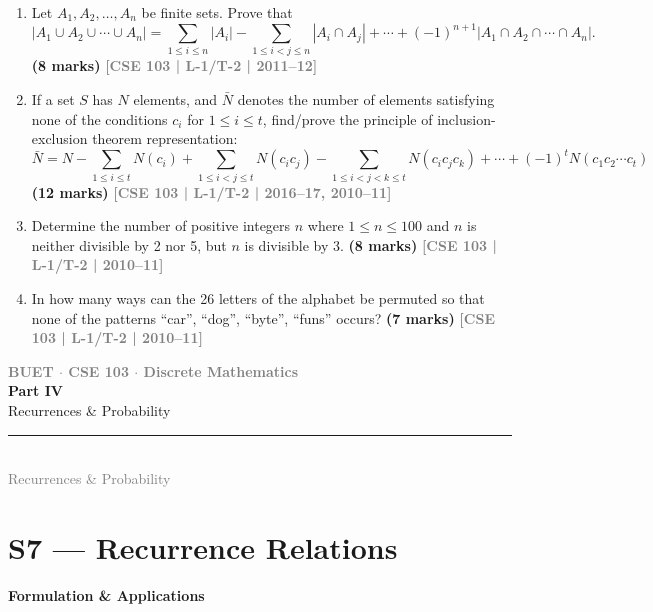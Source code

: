\documentclass[12pt,a3paper]{article}
\newcommand{\yr}[1]{\hfill\textcolor{gray}{\small\textbf{[#1]}}}
\newcommand{\mk}[1]{\textcolor{orange!70!black}{\small\textbf{(#1 marks)}}}
\newcommand{\subtopic}[2]{%
  \vspace{10pt}
  \noindent\begin{tcolorbox}[colback=#1!8,colframe=#1,boxrule=0.6pt,arc=4pt,
    left=6pt,right=6pt,top=4pt,bottom=4pt]
    \small\bfseries\textcolor{#1}{#2}
  \end{tcolorbox}
  \vspace{2pt}
}
\newcommand{\secdivider}[4]{%
  \newpage\thispagestyle{empty}%
  \vspace*{\fill}%
  \begin{tcolorbox}[enhanced,colback=#4!7,colframe=#3,boxrule=1.5pt,arc=8pt,
    left=20pt,right=20pt,top=22pt,bottom=22pt,
    shadow={3pt}{-3pt}{0pt}{black!15}]
    \centering
    {\large\textcolor{gray}{\textbf{BUET $\cdot$ CSE 103 $\cdot$ Discrete Mathematics}}}\\[8pt]
    {\fontsize{26}{32}\selectfont\bfseries\textcolor{#3}{#1}}\\[6pt]
    {\fontsize{15}{19}\selectfont\textcolor{dgray}{#2}}\\[12pt]
    \textcolor{#3!60}{\rule{0.5\textwidth}{0.5pt}}\\[6pt]
    {\small\textcolor{gray}{#2}}
  \end{tcolorbox}%
  \vspace*{\fill}\newpage%
}
\begin{document}
\begin{enumerate}
\item Let $A_1, A_2, \ldots, A_n$ be finite sets. Prove that
\[
  |A_1 \cup A_2 \cup \cdots \cup A_n| = \sum_{1 \leq i \leq n}|A_i| - \sum_{1 \leq i < j \leq n}|A_i \cap A_j| + \cdots + (-1)^{n+1}|A_1 \cap A_2 \cap \cdots \cap A_n|.
\]
\mk{8} \yr{CSE 103 | L-1/T-2 | 2011--12}

\item If a set $S$ has $N$ elements, and $\bar{N}$ denotes the number of elements satisfying none of the conditions $c_i$ for $1 \leq i \leq t$, find/prove the principle of inclusion-exclusion theorem representation:
\[
  \bar{N} = N - \sum_{1 \leq i \leq t} N(c_i) + \sum_{1 \leq i < j \leq t} N(c_i c_j) - \sum_{1 \leq i < j < k \leq t} N(c_i c_j c_k) + \cdots + (-1)^t N(c_1 c_2 \cdots c_t)
\]
\mk{12} \yr{CSE 103 | L-1/T-2 | 2016--17, 2010--11}

\item Determine the number of positive integers $n$ where $1 \leq n \leq 100$ and $n$ is neither divisible by 2 nor 5, but $n$ is divisible by 3.
\mk{8} \yr{CSE 103 | L-1/T-2 | 2010--11}

\item In how many ways can the 26 letters of the alphabet be permuted so that none of the patterns ``car'', ``dog'', ``byte'', ``funs'' occurs?
\mk{7} \yr{CSE 103 | L-1/T-2 | 2010--11}

\end{enumerate}



\secdivider{Part IV}{Recurrences \& Probability}{cD}{cD}


\section{S7 --- Recurrence Relations}
\label{sec:S7}

\subtopic{cD}{Formulation \& Applications}
\label{sub:s7-recurrence-formulation}
\end{document}
